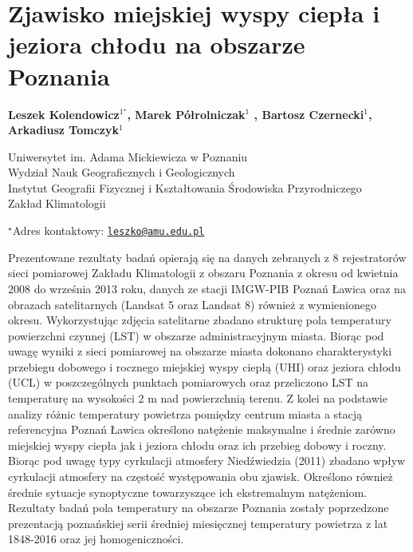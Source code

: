\documentclass[\main/boa.tex]{subfiles}
\begin{document}
\section{Zjawisko miejskiej wyspy ciepła i jeziora chłodu na obszarze Poznania}

\begin{center}
  {\bf {} Leszek Kolendowicz$^{1^\star}$,  Marek Półrolniczak$^{1}$ ,  Bartosz Czernecki$^{1}$,   Arkadiusz Tomczyk$^{1}$}
\end{center}

\vskip 0.3cm

\begin{affiliations}
\begin{enumerate}
\begin{minipage}{0.915\textwidth}
\centering
\item Uniwersytet im. Adama Mickiewicza w Poznaniu \\ Wydział Nauk Geograficznych i Geologicznych  \\ Instytut Geografii Fizycznej i Kształtowania Środowiska Przyrodniczego\\
Zakład Klimatologii \\[-2pt]
\end{minipage}
\end{enumerate}
$^\star$Adres kontaktowy: \href{mailto:leszko@amu.edu.pl}{\nolinkurl{leszko@amu.edu.pl}}\\
\end{affiliations}

\vskip 0.5cm


\vskip 0.5cm

Prezentowane rezultaty badań opierają się na danych zebranych z 8 rejestratorów sieci pomiarowej Zakładu Klimatologii z obszaru Poznania z okresu od kwietnia 2008 do września 2013 roku, danych ze stacji IMGW-PIB Poznań Ławica oraz na obrazach satelitarnych (Landsat 5 oraz Landsat 8) również z wymienionego okresu. Wykorzystując zdjęcia satelitarne zbadano strukturę pola temperatury powierzchni czynnej (LST) w obszarze administracyjnym miasta. Biorąc pod uwagę wyniki z sieci pomiarowej na obszarze miasta dokonano charakterystyki przebiegu dobowego i rocznego miejskiej wyspy ciepłą (UHI) oraz jeziora chłodu (UCL) w poszczególnych punktach pomiarowych oraz przeliczono LST na temperaturę na wysokości 2 m nad powierzchnią terenu. Z kolei na podstawie analizy różnic temperatury powietrza pomiędzy centrum miasta a stacją referencyjna Poznań Ławica określono natężenie maksymalne i średnie zarówno miejskiej wyspy ciepła jak i jeziora chłodu oraz ich przebieg dobowy i roczny. Biorąc pod uwagę typy cyrkulacji atmosfery Niedźwiedzia (2011) zbadano wpływ cyrkulacji atmosfery na częstość występowania obu zjawisk. Określono również średnie sytuacje synoptyczne towarzyszące ich ekstremalnym natężeniom. Rezultaty badań pola temperatury na obszarze Poznania zostały poprzedzone prezentacją poznańskiej serii średniej miesięcznej temperatury powietrza z lat 1848-2016 oraz jej homogeniczności. 
\end{document}
